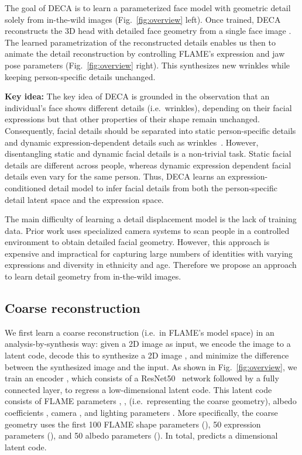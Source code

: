 \documentclass[final]{cvpr}
\newcommand{\qheading}[1]{\noindent\textbf{#1}}
\newcommand{\modelname}{DECA\xspace}
\begin{document}
The goal of \modelname is to learn a parameterized face model with geometric detail solely from in-the-wild images (Fig.~\ref{fig:overview} left).
Once trained, \modelname reconstructs the 3D head with detailed face geometry from a single face image . 
The learned parametrization of the reconstructed details enables us then to animate the detail reconstruction by controlling FLAME's expression and jaw pose parameters (Fig.~\ref{fig:overview} right).
This synthesizes new wrinkles while keeping person-specific details unchanged. 

\qheading{Key idea:}
The key idea of \modelname is grounded in the observation that an individual's face shows different details (i.e.~wrinkles), depending on their facial expressions but that other properties of their shape remain unchanged.
Consequently, facial details should be  separated into static person-specific details and dynamic expression-dependent details such as wrinkles~\cite{Li2009RobustSG}. 
However, disentangling static and dynamic facial details is a non-trivial task.
Static facial details are different across people, whereas dynamic expression dependent facial details even vary for the same person.
Thus, \modelname learns an expression-conditioned detail model to infer facial details from both the person-specific detail latent space and the expression space. 

The main difficulty of learning a detail displacement model is the lack of training data. 
Prior work uses specialized camera systems to scan people in a controlled environment to obtain detailed facial geometry. 
However, this approach is expensive and impractical for capturing large numbers of identities with varying expressions and diversity in ethnicity and age. 
Therefore we propose an approach to learn detail geometry from in-the-wild images.

\subsection{Coarse reconstruction}
We first learn a coarse reconstruction (i.e.~in FLAME's model space) in an analysis-by-synthesis way: given a 2D image  as input, we encode the image to a latent code, decode this to synthesize a 2D image , and minimize the difference between the synthesized image and the input.
As shown in Fig.~\ref{fig:overview}, we train an encoder , which consists of a ResNet50~\cite{He2015DeepRL} network followed by a fully connected layer, to regress a low-dimensional latent code.
This latent code consists of FLAME parameters , ,  (i.e.~representing the coarse geometry), albedo coefficients , camera , and lighting parameters . 
More specifically, the coarse geometry uses the first 100 FLAME shape parameters (), 50 expression parameters (), and 50 albedo parameters (). 
In total,  predicts a  dimensional latent code.
\end{document}

